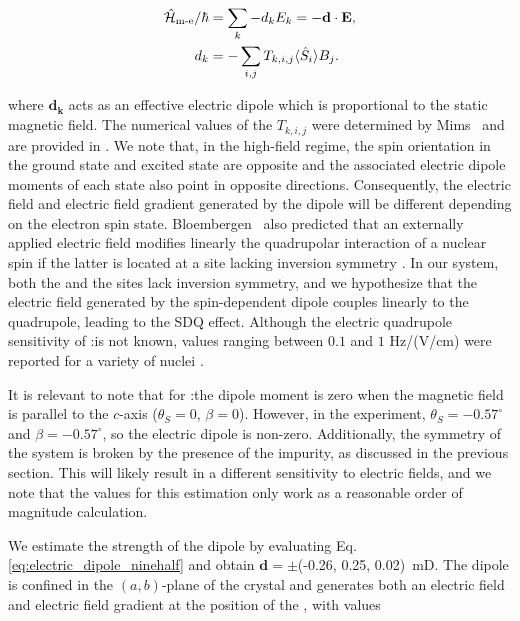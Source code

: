 \begin{align}
\begin{split}
    \hat{\mathcal{H}}_{\text{m-e}} / \hbar &= \sum_k-d_k E_k = -\mathbf{d} \cdot \mathbf{E}, \\
    d_k &= - \sum_{i,j} T_{k, i, j} \langle \hat{S}_{i}\rangle B_j.
\end{split}
\label{eq:electric_dipole_ninehalf}
\end{align}

where $\mathbf{d_k}$ acts as an effective electric dipole which is proportional to the static magnetic field. The numerical values of the $T_{k,i,j}$ were determined by Mims~ and are provided in . We note that, in the high-field regime, the spin orientation in the ground state and excited state are opposite and the associated electric dipole moments of each state also point in opposite directions. Consequently, the electric field and electric field gradient generated by the dipole will be different depending on the electron spin state. Bloembergen~ also predicted that an externally applied electric field modifies linearly the quadrupolar interaction of a nuclear spin if the latter is located at a site lacking inversion symmetry . In our system, both the \Er and the \Nb sites lack inversion symmetry, and we hypothesize that the electric field generated by the spin-dependent \Er dipole couples linearly to the \Nb quadrupole, leading to the SDQ effect. Although the electric quadrupole sensitivity of \Nb:\Ca is not known, values ranging between $0.1$ and $1$ Hz/(V/cm) were reported for a variety of nuclei .

It is relevant to note that for \Er:\Ca the dipole moment is zero when the magnetic field is parallel to the $c$-axis ($\theta_S = 0$, $\beta = 0$). However, in the experiment, $\theta_S=-0.57^\circ$ and $\beta=-0.57^\circ$, so the electric dipole is non-zero. Additionally, the symmetry of the system is broken by the presence of the \Nb impurity, as discussed in the previous section. This will likely result in a different sensitivity to electric fields, and we note that the values for this estimation only work as a reasonable order of magnitude calculation.

We estimate the strength of the dipole by evaluating Eq. \ref{eq:electric_dipole_ninehalf} and obtain $\mathbf{d} = \pm$(-0.26, 0.25, 0.02)~mD. The dipole is confined in the $(a,b)$-plane of the crystal and generates both an electric field and electric field gradient at the position of the \Nb, with values


